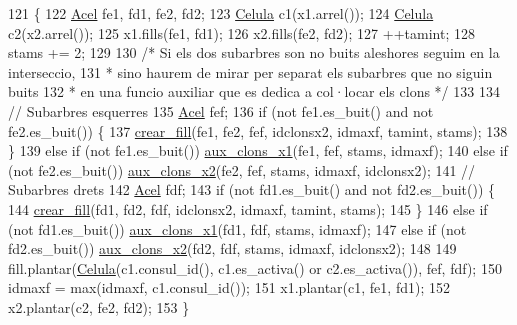 \begin{DoxyCode}
121                                                               \{
122     \hyperlink{class_organisme_a6322ecf5313caa7df794a33c4fc58f4e}{Acel} fe1, fd1, fe2, fd2;
123     \hyperlink{class_celula}{Celula} c1(x1.arrel());
124     \hyperlink{class_celula}{Celula} c2(x2.arrel());
125     x1.fills(fe1, fd1);
126     x2.fills(fe2, fd2);
127     ++tamint;
128     stams += 2;
129 
130     \textcolor{comment}{/* Si els dos subarbres son no buits aleshores seguim en la interseccio,
}
131 \textcolor{comment}{     * sino haurem de mirar per separat els subarbres que no siguin buits
}
132 \textcolor{comment}{     * en una funcio auxiliar que es dedica a col·locar els clons */}
133 
134     \textcolor{comment}{// Subarbres esquerres}
135     \hyperlink{class_organisme_a6322ecf5313caa7df794a33c4fc58f4e}{Acel} fef;
136     \textcolor{keywordflow}{if} (not fe1.es\_buit() and not fe2.es\_buit()) \{
137         \hyperlink{class_organisme_a8b9eaa46043031bbc5cb0c4aa3226b66}{crear\_fill}(fe1, fe2, fef, idclonsx2, idmaxf, tamint, stams);
138     \}
139     \textcolor{keywordflow}{else} \textcolor{keywordflow}{if} (not fe1.es\_buit()) \hyperlink{class_organisme_ac7d5375d049b554778f5b2769618160d}{aux\_clons\_x1}(fe1, fef, stams, idmaxf);
140     \textcolor{keywordflow}{else} \textcolor{keywordflow}{if} (not fe2.es\_buit()) \hyperlink{class_organisme_ab6232adf26f92b75902f25fccdd91a13}{aux\_clons\_x2}(fe2, fef, stams, idmaxf, idclonsx2);
141     \textcolor{comment}{// Subarbres drets}
142     \hyperlink{class_organisme_a6322ecf5313caa7df794a33c4fc58f4e}{Acel} fdf;
143     \textcolor{keywordflow}{if} (not fd1.es\_buit() and not fd2.es\_buit()) \{
144         \hyperlink{class_organisme_a8b9eaa46043031bbc5cb0c4aa3226b66}{crear\_fill}(fd1, fd2, fdf, idclonsx2, idmaxf, tamint, stams);
145     \}
146     \textcolor{keywordflow}{else} \textcolor{keywordflow}{if} (not fd1.es\_buit()) \hyperlink{class_organisme_ac7d5375d049b554778f5b2769618160d}{aux\_clons\_x1}(fd1, fdf, stams, idmaxf);
147     \textcolor{keywordflow}{else} \textcolor{keywordflow}{if} (not fd2.es\_buit()) \hyperlink{class_organisme_ab6232adf26f92b75902f25fccdd91a13}{aux\_clons\_x2}(fd2, fdf, stams, idmaxf, idclonsx2);
148 
149     fill.plantar(\hyperlink{class_celula}{Celula}(c1.consul\_id(), c1.es\_activa() or c2.es\_activa()), fef, fdf);
150     idmaxf = max(idmaxf, c1.consul\_id());
151     x1.plantar(c1, fe1, fd1);
152     x2.plantar(c2, fe2, fd2);
153 \}
\end{DoxyCode}
